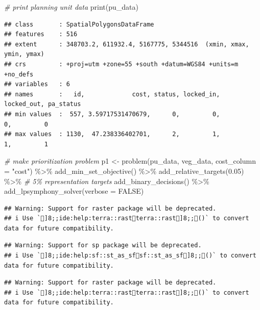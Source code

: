 \documentclass[
  12pt,
]{book}
\newenvironment{Shaded}{\begin{snugshade}}{\end{snugshade}}
\newcommand{\AttributeTok}[1]{\textcolor[rgb]{0.77,0.63,0.00}{#1}}
\newcommand{\CommentTok}[1]{\textcolor[rgb]{0.56,0.35,0.01}{\textit{#1}}}
\newcommand{\ConstantTok}[1]{\textcolor[rgb]{0.00,0.00,0.00}{#1}}
\newcommand{\FloatTok}[1]{\textcolor[rgb]{0.00,0.00,0.81}{#1}}
\newcommand{\FunctionTok}[1]{\textcolor[rgb]{0.00,0.00,0.00}{#1}}
\newcommand{\NormalTok}[1]{#1}
\newcommand{\OtherTok}[1]{\textcolor[rgb]{0.56,0.35,0.01}{#1}}
\newcommand{\SpecialCharTok}[1]{\textcolor[rgb]{0.00,0.00,0.00}{#1}}
\newcommand{\StringTok}[1]{\textcolor[rgb]{0.31,0.60,0.02}{#1}}
\begin{document}
\begin{Shaded}
\begin{Highlighting}[]
\CommentTok{\# print planning unit data}
\FunctionTok{print}\NormalTok{(pu\_data)}
\end{Highlighting}
\end{Shaded}

\begin{verbatim}
## class       : SpatialPolygonsDataFrame 
## features    : 516 
## extent      : 348703.2, 611932.4, 5167775, 5344516  (xmin, xmax, ymin, ymax)
## crs         : +proj=utm +zone=55 +south +datum=WGS84 +units=m +no_defs 
## variables   : 6
## names       :   id,             cost, status, locked_in, locked_out, pa_status 
## min values  :  557, 3.59717531470679,      0,         0,          0,         0 
## max values  : 1130,  47.238336402701,      2,         1,          1,         1
\end{verbatim}

\begin{Shaded}
\begin{Highlighting}[]
\CommentTok{\# make prioritization problem}
\NormalTok{p1 }\OtherTok{\textless{}{-}} \FunctionTok{problem}\NormalTok{(pu\_data, veg\_data, }\AttributeTok{cost\_column =} \StringTok{"cost"}\NormalTok{) }\SpecialCharTok{\%\textgreater{}\%}
      \FunctionTok{add\_min\_set\_objective}\NormalTok{() }\SpecialCharTok{\%\textgreater{}\%}
      \FunctionTok{add\_relative\_targets}\NormalTok{(}\FloatTok{0.05}\NormalTok{) }\SpecialCharTok{\%\textgreater{}\%} \CommentTok{\# 5\% representation targets}
      \FunctionTok{add\_binary\_decisions}\NormalTok{() }\SpecialCharTok{\%\textgreater{}\%}
      \FunctionTok{add\_lpsymphony\_solver}\NormalTok{(}\AttributeTok{verbose =} \ConstantTok{FALSE}\NormalTok{)}
\end{Highlighting}
\end{Shaded}

\begin{verbatim}
## Warning: Support for raster package will be deprecated.
## i Use `]8;;ide:help:terra::rastterra::rast]8;;()` to convert data for future compatibility.
\end{verbatim}

\begin{verbatim}
## Warning: Support for sp package will be deprecated.
## i Use `]8;;ide:help:sf::st_as_sfsf::st_as_sf]8;;()` to convert data for future compatibility.
\end{verbatim}

\begin{verbatim}
## Warning: Support for raster package will be deprecated.
## i Use `]8;;ide:help:terra::rastterra::rast]8;;()` to convert data for future compatibility.
\end{verbatim}
\end{document}
